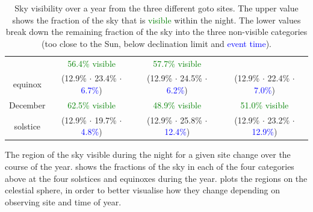 \begin{colsection}
\begin{colsection}
\begin{table}[t]
\begin{center}
\begin{tabular}{c|ccc}
                      & \textcolor{Green}{56.4\% visible}
                      & \textcolor{Green}{57.7\% visible}
                      \\
            equinox   & {\scriptsize(\textcolor{BurntOrange}{12.9\%} $\cdot$
                                     \textcolor{NavyBlue}{23.4\%} $\cdot$
                                     \textcolor{Blue}{6.7\%})}
                      & {\scriptsize(\textcolor{BurntOrange}{12.9\%} $\cdot$
                                     \textcolor{NavyBlue}{24.5\%} $\cdot$
                                     \textcolor{Blue}{6.2\%})}
                      & {\scriptsize(\textcolor{BurntOrange}{12.9\%} $\cdot$
                                     \textcolor{NavyBlue}{22.4\%} $\cdot$
                                     \textcolor{Blue}{7.0\%})}
                      \\[0.5cm]
            December  & \textcolor{Green}{62.5\% visible}
                      & \textcolor{Green}{48.9\% visible}
                      & \textcolor{Green}{51.0\% visible}
                      \\
            solstice  & {\scriptsize(\textcolor{BurntOrange}{12.9\%} $\cdot$
                                     \textcolor{NavyBlue}{19.7\%} $\cdot$
                                     \textcolor{Blue}{4.8\%})}
                      & {\scriptsize(\textcolor{BurntOrange}{12.9\%} $\cdot$
                                     \textcolor{NavyBlue}{25.8\%} $\cdot$
                                     \textcolor{Blue}{12.4\%})}
                      & {\scriptsize(\textcolor{BurntOrange}{12.9\%} $\cdot$
                                     \textcolor{NavyBlue}{23.2\%} $\cdot$
                                     \textcolor{Blue}{12.9\%})}
                      \\
        \end{tabular}
    \end{center}

    \caption[Sky visibility over a year]{
        Sky visibility over a year from the three different \gls{goto} sites. The upper value shows the fraction of the sky that is \textcolor{Green}{visible} within the night. The lower values break down the remaining fraction of the sky into the three non-visible categories (\textcolor{BurntOrange}{too close to the Sun}, \textcolor{NavyBlue}{below declination limit} and \textcolor{Blue}{event time}).
    }\label{tab:visibility}
\end{table}

The region of the sky visible during the night for a given site change over the course of the year.  shows the fractions of the sky in each of the four categories above at the four solstices and equinoxes during the year.  plots the regions on the celestial sphere, in order to better visualise how they change depending on observing site and time of year.


\end{colsection}
\end{colsection}

